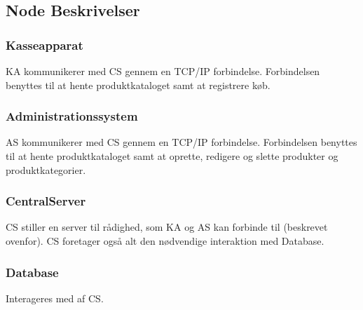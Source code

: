 \subsection{Node Beskrivelser}

\subsubsection{Kasseapparat}
\gls{KA} kommunikerer med \gls{CS} gennem en TCP/IP forbindelse. Forbindelsen benyttes til at hente produktkataloget samt at registrere køb.

\subsubsection{Administrationssystem}
\gls{AS} kommunikerer med \gls{CS} gennem en TCP/IP forbindelse. Forbindelsen benyttes til at hente produktkataloget samt at oprette, redigere og slette produkter og produktkategorier.

\subsubsection{CentralServer}
\gls{CS} stiller en server til rådighed, som \gls{KA} og \gls{AS} kan forbinde til (beskrevet ovenfor). \gls{CS} foretager også alt den nødvendige interaktion med Database.

\subsubsection{Database}
Interageres med af \gls{CS}.